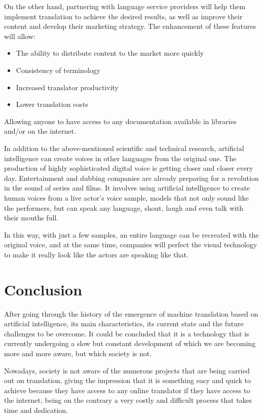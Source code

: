\documentclass[a4paper]{article}
\theoremstyle{plain}
\theoremstyle{definition}
\begin{document}
    On the other hand, partnering with language service providers will help them implement translation to achieve the desired results, as well as improve their content and develop their marketing strategy. The enhancement of these features will allow:
    \begin{itemize}
        \item The ability to distribute content to the market more quickly
        \item Consistency of terminology
        \item Increased translator productivity
        \item Lower translation costs
    \end{itemize}
    Allowing anyone to have access to any documentation available in libraries and/or on the internet.\par 

In addition to the above-mentioned scientific and technical research, artificial intelligence can create voices in other languages from the original one. The production of highly sophisticated digital voice is getting closer and closer every day. Entertainment and dubbing companies are already preparing for a revolution in the sound of series and films. It involves using artificial intelligence to create human voices from a live actor's voice sample, models that not only sound like the performers, but can speak any language, shout, laugh and even talk with their mouths full.

In this way, with just a few samples, an entire language can be recreated with the original voice, and at the same time, companies will perfect the visual technology to make it really look like the actors are speaking like that.


	
	\section{Conclusion}

	After going through the history of the emergence of machine translation based on artificial intelligence, its main characteristics, its current state and the future challenges to be overcome. It could be concluded that it is a technology that is currently undergoing a slow but constant development of which we are becoming more and more aware, but which society is not.\par 
    Nowadays, society is not aware of the numerous projects that are being carried out on translation, giving the impression that it is something easy and quick to achieve because they have access to any online translator if they have access to the internet, being on the contrary a very costly and difficult process that takes time and dedication.
\end{document}
